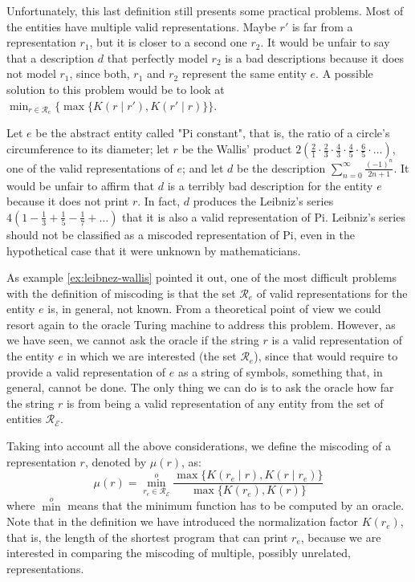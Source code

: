 Unfortunately, this last definition still presents some practical problems. Most of the entities have multiple valid representations. Maybe $r'$ is far from a representation $r_1$, but it is closer to a second one $r_2$. It would be unfair to say that a description $d$ that perfectly model $r_2$ is a bad descriptions because it does not model $r_1$, since both, $r_1$ and $r_2$ represent the same entity $e$. A possible solution to this problem would be to look at $\min_{r \in \mathcal{R}_e} \{ \max\{ K(r \mid r'), K(r' \mid r)\} \}$.

\begin{example}
\label{ex:leibnez-wallis}
Let $e$ be the abstract entity called "Pi constant", that is, the ratio of a circle's circumference to its diameter; let $r$ be the Wallis' product $2 (\frac{2}{1} \cdot \frac{2}{3} \cdot \frac{4}{3} \cdot \frac{4}{5} \cdot \frac{6}{5} \cdot \ldots)$, one of the valid representations of $e$; and let $d$ be the description $\sum_{n=0}^\infty \frac{(-1)^n}{2n+1}$. It would be unfair to affirm that $d$ is a terribly bad description for the entity $e$ because it does not print $r$. In fact, $d$ produces the Leibniz's series $4 (1 - \frac{1}{3} + \frac{1}{5} - \frac{1}{7} + \ldots)$ that it is also a valid representation of Pi. Leibniz's series should not be classified as a miscoded representation of Pi, even in the hypothetical case that it were unknown by mathematicians.
\end{example}

As example \ref{ex:leibnez-wallis} pointed it out, one of the most difficult problems with the definition of miscoding is that the set $\mathcal{R}_e$ of valid representations for the entity $e$ is, in general, not known. From a theoretical point of view we could resort again to the oracle Turing machine to address this problem. However, as we have seen, we cannot ask the oracle if the string $r$ is a valid representation of the entity $e$ in which we are interested (the set $\mathcal{R}_e$), since that would require to provide a valid representation of $e$ as a string of symbols, something that, in general, cannot be done. The only thing we can do is to ask the oracle how far the string $r$ is from being a valid representation of any entity from the set of entities $\mathcal{R}_\mathcal{E}$.

Taking into account all the above considerations, we define the miscoding of a representation $r$, denoted by $\mu(r)$, as:
\[
\mu(r) = \overset{o}{ \underset{r_e \in \mathcal{R}_\mathcal{E}} \min} \frac{ \max\{ K(r_e \mid r), K(r \mid r_e) \} } { \max\{ K(r_e), K(r) \} }
\]
where $\overset{o} \min$ means that the minimum function has to be computed by an oracle. Note that in the definition we have introduced the normalization factor $K(r_e)$, that is, the length of the shortest program that can print $r_e$, because we are interested in comparing the miscoding of multiple, possibly unrelated, representations.

